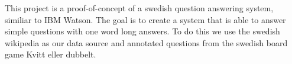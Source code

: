 
This project is a proof-of-concept of a swedish question answering system, similiar to IBM Watson.
The goal is to create a system that is able to answer simple questions with one word long answers.
To do this we use the swedish wikipedia as our data source and annotated questions from the swedish board game Kvitt eller dubbelt.

